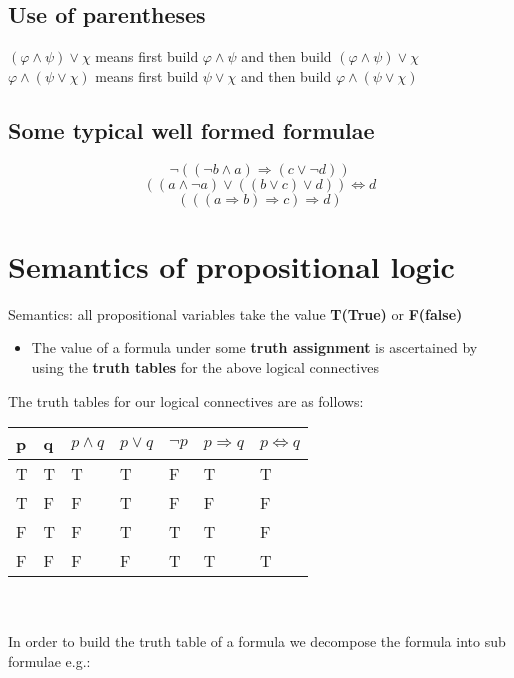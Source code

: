 \documentclass{article}[18pt]
\begin{document}
\subsection{Use of parentheses}
$(\varphi \land \psi)\lor\chi$ means first build $\varphi\land\psi$ and then build $(\varphi \land \psi)\lor\chi$\\
$\varphi \land (\psi\lor\chi)$ means first build $\psi\lor\chi$ and then build $\varphi \land (\psi\lor\chi)$
\subsection{Some typical well formed formulae}
$$\lnot((\lnot b\land a)\Rightarrow(c\lor\lnot d))$$
$$((a\land\lnot a)\lor((b\lor c)\lor d))\Leftrightarrow d$$
$$(((a\Rightarrow b)\Rightarrow c)\Rightarrow d)$$
\section{Semantics of propositional logic}
Semantics: all propositional variables take the value \textbf{T(True)} or \textbf{F(false)}
\begin{itemize}
\item The value of a formula under some \textbf{truth assignment} is ascertained by using the \textbf{truth tables} for the above logical connectives
\end{itemize}
The truth tables for our logical connectives are as follows:\\
\begin{tabular}{|l|l|l|l|l|l|l|}
\hline
 p&q&$p\land q$&$p\lor q$&$\lnot p$&$p\Rightarrow q$&$p\Leftrightarrow q$  \\ \hline
 T&T&T&T&F&T&T  \\ \hline
 T&F&F&T&F&F&F  \\ \hline
 F&T&F&T&T&T&F  \\ \hline
 F&F&F&F&T&T&T  \\ \hline
\end{tabular}\\ \\
In order to build the truth table of a formula we decompose the formula into sub formulae e.g.:\\
\\
\end{document}
